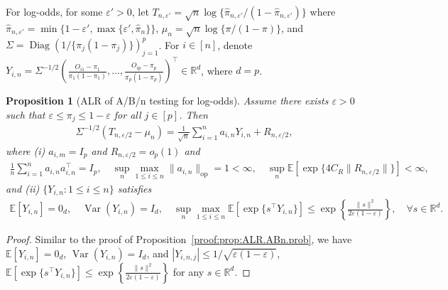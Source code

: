 \documentclass[12pt]{article}
\newcommand{\op}{\mathrm{op}}
\newtheorem{proposition}{Proposition}[section]
\newcommand{\Var}{\operatorname{Var}}
\newcommand{\real}{\mathbb{R}}
\newcommand{\Ee}{{\mathbb{E}}}
\begin{document}
\begin{appendices}
For log-odds, for some $\varepsilon' > 0$, let
$T_{n,\varepsilon'}=\sqrt n\log\{\widehat\pi_{n,\varepsilon'}/(1-\widehat\pi_{n,\varepsilon'})\}$ where $\widehat\pi_{n,\varepsilon'} = \min \{1-\varepsilon', \max\{\varepsilon', \widehat\pi_{n}\}\}$,
$\mu_n=\sqrt n\log\{\pi/(1-\pi)\}$, and
$\Sigma=\operatorname{Diag}\left(1/\{\pi_j(1-\pi_j)\}\right)_{j=1}^p$. For $i\in[n]$, denote
$Y_{i,n}=\Sigma^{-1/2}\left(\frac{O_{i1}-\pi_1}{\pi_1(1-\pi_1)},\ldots,\frac{O_{ip}-\pi_p}{\pi_p(1-\pi_p)}\right)^\top\in\mathbb R^d$, where $d=p$.
\begin{proposition}[ALR of A/B/n testing for log-odds]\label{prop:ALR.ABn.odds}
Assume there exists $\varepsilon>0$ such that $\varepsilon \le \pi_j \le 1-\varepsilon$ for all $j\in[p]$. Then
\begin{align*}
  \Sigma^{-1/2}(T_{n, \varepsilon/2} - \mu_n)
  =
  \frac{1}{\sqrt{n}} \sum_{i=1}^n a_{i,n} Y_{i,n} + R_{n,\varepsilon/2},
\end{align*}
where (i) $a_{i,m}= I_p$ and $R_{n,\varepsilon/2} = o_p(1)$ and
\begin{align*}
  \frac{1}{n}\sum_{i=1}^n a_{i,n}a_{i,n}^{\top}=I_p,
  \quad
  \sup_{n}\max_{1\le i\le n}\|a_{i,n}\|_{\op} = 1 < \infty,
  \quad
  \sup_n\Ee\left[\exp\{4C_R\|R_{n,\varepsilon/2}\|\}\right] <\infty,
\end{align*}
and (ii) $\{Y_{i,n}:1\le i\le n\}$ satisfies
\begin{align*}
  \Ee[Y_{i,n}]=0_d,
  \quad
  \Var(Y_{i,n})=I_d,
  \quad
  \sup_{n}\max_{1\le i\le n}
  \Ee[\exp\{s^\top Y_{i,n}\}]
  \le
  \exp\left\{\frac{\|s\|^2}{2\varepsilon(1-\varepsilon)}\right\},
  \quad
  \forall s\in\real^d.
\end{align*}
\end{proposition}


\begin{proof}\label{proof:prop:ALR.ABn.odds}    
Similar to the proof of Proposition~\ref{proof:prop:ALR.ABn.prob}, we have $\Ee[Y_{i,n}]=0_d$, $\Var(Y_{i,n})=I_d$, and $|Y_{i,n,j}| \le 1/\sqrt{\varepsilon(1-\varepsilon)}$, $\Ee[\exp\{s^\top Y_{i,n}\}] \le \exp\left\{ \frac{\|s\|^2}{2\varepsilon(1-\varepsilon)} \right\}$ for any $s \in \real^d$.



\end{proof}
\end{appendices}
\end{document}
